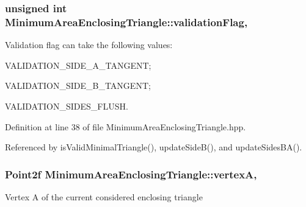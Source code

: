 \hypertarget{classmultiscale_1_1MinimumAreaEnclosingTriangle_abf0daf5b56e3050cbbe70f5d95402cc2}{
\subsubsection[{validation\-Flag}]{\setlength{\rightskip}{0pt plus 5cm}unsigned int Minimum\-Area\-Enclosing\-Triangle\-::validation\-Flag\hspace{0.3cm}{\ttfamily [static]}, {\ttfamily [private]}}}\label{classmultiscale_1_1MinimumAreaEnclosingTriangle_abf0daf5b56e3050cbbe70f5d95402cc2}
Validation flag can take the following values\-:
\begin{DoxyItemize}
\item V\-A\-L\-I\-D\-A\-T\-I\-O\-N\-\_\-\-S\-I\-D\-E\-\_\-\-A\-\_\-\-T\-A\-N\-G\-E\-N\-T;
\item V\-A\-L\-I\-D\-A\-T\-I\-O\-N\-\_\-\-S\-I\-D\-E\-\_\-\-B\-\_\-\-T\-A\-N\-G\-E\-N\-T;
\item V\-A\-L\-I\-D\-A\-T\-I\-O\-N\-\_\-\-S\-I\-D\-E\-S\-\_\-\-F\-L\-U\-S\-H. 
\end{DoxyItemize}

Definition at line 38 of file Minimum\-Area\-Enclosing\-Triangle.\-hpp.



Referenced by is\-Valid\-Minimal\-Triangle(), update\-Side\-B(), and update\-Sides\-B\-A().

\hypertarget{classmultiscale_1_1MinimumAreaEnclosingTriangle_a08e1e2f1a682598a8b336d63654f4628}{
\subsubsection[{vertex\-A}]{\setlength{\rightskip}{0pt plus 5cm}Point2f Minimum\-Area\-Enclosing\-Triangle\-::vertex\-A\hspace{0.3cm}{\ttfamily [static]}, {\ttfamily [private]}}}\label{classmultiscale_1_1MinimumAreaEnclosingTriangle_a08e1e2f1a682598a8b336d63654f4628}
Vertex A of the current considered enclosing triangle 

